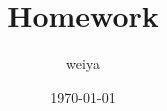 \documentclass[12pt]{article}
\title{Homework}
\author{weiya}
\date{\today}
\begin{document}
\maketitle
\pagestyle{fancy}
\lhead{}
\rhead{}

\textcite{mithani2009stochastic}

\parencite{padilla2018adaptive}

\printbibliography
\end{document}
